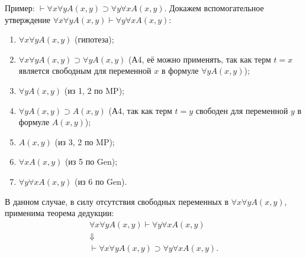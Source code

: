Пример: $\vdash \forall x\forall yA(x, y) \supset \forall y\forall xA(x, y)$. Докажем вспомогательное утверждение $\forall x\forall yA(x, y) \vdash \forall y\forall xA(x, y)$:
\begin{enumerate}
    \item $\forall x\forall yA(x, y)$ (гипотеза);
    \item $\forall x\forall yA(x, y) \supset \forall yA(x, y)$ (А4, её можно применять, так как терм $t = x$ является свободным для переменной $x$ в формуле $\forall yA(x, y)$);
    \item $\forall yA(x, y)$ (из 1, 2 по MP);
    \item $\forall yA(x, y) \supset A(x, y)$ (А4, так как терм $t = y$ свободен для переменной $y$ в формуле $A(x, y)$);
    \item $A(x, y)$ (из 3, 2 по MP);
    \item $\forall xA(x, y)$ (из 5 по Gen);
    \item $\forall y\forall xA(x, y)$ (из 6 по Gen).
\end{enumerate}
В данном случае, в силу отсутствия свободных переменных в $\forall x\forall yA(x, y)$, применима теорема дедукции: 
\begin{gather*}
    \forall x\forall yA(x, y) \vdash \forall y\forall xA(x, y) \\
    \Downarrow \\
    \vdash \forall x\forall yA(x, y) \supset \forall y\forall xA(x, y).
\end{gather*}